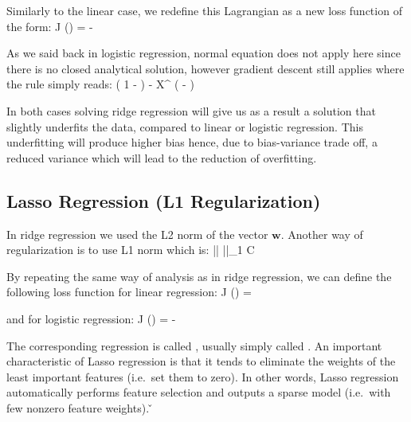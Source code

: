 Similarly to the linear case, we redefine this Lagrangian as a new loss function of the form:
\bse
J () = -  
\ese

As we said back in logistic regression, normal equation does not apply here since there is no closed analytical
solution, however gradient descent still applies where the rule simply reads:
\bse
{} \coloneqq \Big( 1 -  \Big)  -  X^{\intercal}
\Big( - \Big)
\ese

In both cases solving ridge regression will give us as a result a solution that slightly underfits the data, compared
to linear or logistic regression. This underfitting will produce higher bias hence, due to bias-variance trade off, a
reduced variance which will lead to the reduction of overfitting.

\subsection{Lasso Regression (L1 Regularization)}

In ridge regression we used the L2 norm of the vector $\boldsymbol{w}$. Another way of regularization is to use L1
norm which is:
\bse
||  ||_1 \leq C
\ese

By repeating the same way of analysis as in ridge regression, we can define the following loss function for linear
regression:
\bse
J () =  
\ese

and for logistic regression:
\bse
J () = -  
\ese

The corresponding regression is called , usually
simply called . An important characteristic of Lasso regression is that it tends to eliminate
the weights of the least important features (i.e.\ set them to zero). In other words, Lasso regression automatically
performs feature selection and outputs a sparse model (i.e.\ with few nonzero feature weights). \v

